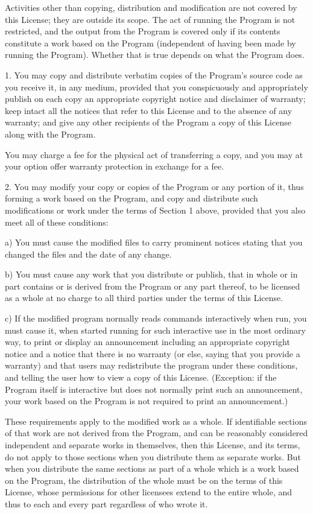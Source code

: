 \documentclass[11pt,a4paper]{article}
\begin{document}
\begin{itemize}
		Activities other than copying, distribution and modification are not
		covered by this License; they are outside its scope.  The act of
		running the Program is not restricted, and the output from the Program
		is covered only if its contents constitute a work based on the
		Program (independent of having been made by running the Program).
		Whether that is true depends on what the Program does.

		1. You may copy and distribute verbatim copies of the Program's
		source code as you receive it, in any medium, provided that you
		conspicuously and appropriately publish on each copy an appropriate
		copyright notice and disclaimer of warranty; keep intact all the
		notices that refer to this License and to the absence of any warranty;
		and give any other recipients of the Program a copy of this License
		along with the Program.

		You may charge a fee for the physical act of transferring a copy, and
		you may at your option offer warranty protection in exchange for a fee.

		2. You may modify your copy or copies of the Program or any portion
		of it, thus forming a work based on the Program, and copy and
		distribute such modifications or work under the terms of Section 1
		above, provided that you also meet all of these conditions:

		a) You must cause the modified files to carry prominent notices
		stating that you changed the files and the date of any change.

		b) You must cause any work that you distribute or publish, that in
		whole or in part contains or is derived from the Program or any
		part thereof, to be licensed as a whole at no charge to all third
		parties under the terms of this License.

		c) If the modified program normally reads commands interactively
		when run, you must cause it, when started running for such
		interactive use in the most ordinary way, to print or display an
		announcement including an appropriate copyright notice and a
		notice that there is no warranty (or else, saying that you provide
		a warranty) and that users may redistribute the program under
		these conditions, and telling the user how to view a copy of this
		License.  (Exception: if the Program itself is interactive but
		does not normally print such an announcement, your work based on
		the Program is not required to print an announcement.)

		These requirements apply to the modified work as a whole.  If
		identifiable sections of that work are not derived from the Program,
		and can be reasonably considered independent and separate works in
		themselves, then this License, and its terms, do not apply to those
		sections when you distribute them as separate works.  But when you
		distribute the same sections as part of a whole which is a work based
		on the Program, the distribution of the whole must be on the terms of
		this License, whose permissions for other licensees extend to the
		entire whole, and thus to each and every part regardless of who wrote it.


\end{itemize}
\end{document}
